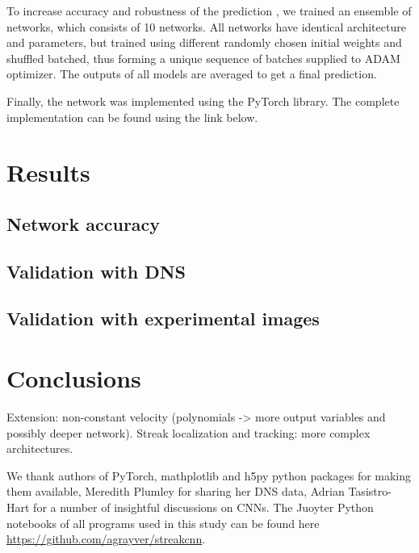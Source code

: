 \documentclass{svjour3}                     %
\begin{document}
To increase accuracy and robustness of the prediction \cite{hinton2015distilling}, we trained an ensemble of networks, which consists of 10 networks. All networks have identical architecture and parameters, but trained using different randomly chosen initial weights \cite{glorot2010understanding, he2015delving} and shuffled batched, thus forming a unique sequence of batches supplied to ADAM optimizer. The outputs of all models are averaged to get a final prediction.

Finally, the network was implemented using the PyTorch library. The complete implementation can be found using the link below.

\section{Results}

\subsection{Network accuracy}

\subsection{Validation with DNS}

\subsection{Validation with experimental images}

\section{Conclusions}

Extension: non-constant velocity (polynomials -> more output variables and possibly deeper network).
Streak localization and tracking: more complex architectures.

\begin{acknowledgements}
We thank authors of PyTorch, mathplotlib and h5py python packages for making them available, Meredith Plumley for sharing her DNS data, Adrian Tasistro-Hart for a number of insightful discussions on CNNs. The Juoyter Python notebooks of all programs used in this study can be found here \url{https://github.com/agrayver/streakcnn}.
\end{acknowledgements}





\end{document}
